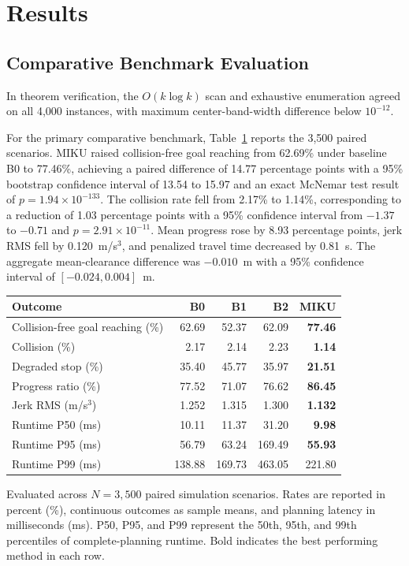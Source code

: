 \section{Results}
\label{sec:results}

\subsection{Comparative Benchmark Evaluation}
\label{subsec:results_main}

In theorem verification, the $O(k\log k)$ scan and exhaustive enumeration agreed on all 4,000 instances, with maximum center-band-width difference below $10^{-12}$.

For the primary comparative benchmark, Table~\ref{tab:main_results} reports the 3,500 paired scenarios. MIKU raised collision-free goal reaching from 62.69\% under baseline B0 to 77.46\%, achieving a paired difference of 14.77 percentage points with a 95\% bootstrap confidence interval of 13.54 to 15.97 and an exact McNemar test result of $p=1.94\times10^{-133}$. The collision rate fell from 2.17\% to 1.14\%, corresponding to a reduction of 1.03 percentage points with a 95\% confidence interval from $-1.37$ to $-0.71$ and $p=2.91\times10^{-11}$. Mean progress rose by 8.93 percentage points, jerk RMS fell by 0.120~m/s$^3$, and penalized travel time decreased by 0.81~s. The aggregate mean-clearance difference was $-0.010$~m with a 95\% confidence interval of $[-0.024,0.004]$~m.

\begin{table}
{
\begin{tabular}{lrrrr}
\toprule
Outcome & B0 & B1 & B2 & MIKU \\
\midrule
Collision-free goal reaching (\%) & 62.69 & 52.37 & 62.09 & \textbf{77.46} \\
Collision (\%) & 2.17 & 2.14 & 2.23 & \textbf{1.14} \\
Degraded stop (\%) & 35.40 & 45.77 & 35.97 & \textbf{21.51} \\
Progress ratio (\%) & 77.52 & 71.07 & 76.62 & \textbf{86.45} \\
Jerk RMS (m/s$^3$) & 1.252 & 1.315 & 1.300 & \textbf{1.132} \\
Runtime P50 (ms) & 10.11 & 11.37 & 31.20 & \textbf{9.98} \\
Runtime P95 (ms) & 56.79 & 63.24 & 169.49 & \textbf{55.93} \\
Runtime P99 (ms) & 138.88 & 169.73 & 463.05 & 221.80 \\
\bottomrule
\end{tabular}}
\begin{tabnote}[Notes]
Evaluated across $N=3,500$ paired simulation scenarios. Rates are reported in percent (\%), continuous outcomes as sample means, and planning latency in milliseconds (ms). P50, P95, and P99 represent the 50th, 95th, and 99th percentiles of complete-planning runtime. Bold indicates the best performing method in each row.
\end{tabnote}
\label{tab:main_results}
\end{table}

